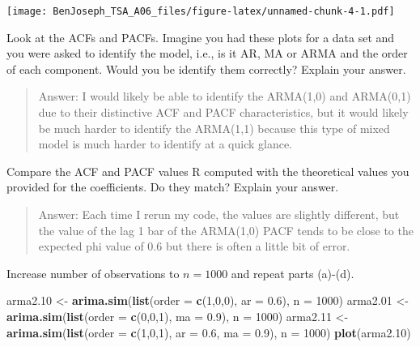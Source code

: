\documentclass[
]{article}
\newenvironment{Shaded}{\begin{snugshade}}{\end{snugshade}}
\newcommand{\DataTypeTok}[1]{\textcolor[rgb]{0.13,0.29,0.53}{#1}}
\newcommand{\DecValTok}[1]{\textcolor[rgb]{0.00,0.00,0.81}{#1}}
\newcommand{\FloatTok}[1]{\textcolor[rgb]{0.00,0.00,0.81}{#1}}
\newcommand{\KeywordTok}[1]{\textcolor[rgb]{0.13,0.29,0.53}{\textbf{#1}}}
\newcommand{\NormalTok}[1]{#1}
\newcommand{\StringTok}[1]{\textcolor[rgb]{0.31,0.60,0.02}{#1}}
\begin{document}
\texttt{[image: BenJoseph\_TSA\_A06\_files/figure-latex/unnamed-chunk-4-1.pdf]}

\item

Look at the ACFs and PACFs. Imagine you had these plots for a data set
and you were asked to identify the model, i.e., is it AR, MA or ARMA and
the order of each component. Would you be identify them correctly?
Explain your answer.

\begin{quote}
Answer: I would likely be able to identify the ARMA(1,0) and ARMA(0,1)
due to their distinctive ACF and PACF characteristics, but it would
likely be much harder to identify the ARMA(1,1) because this type of
mixed model is much harder to identify at a quick glance.
\end{quote}

\item

Compare the ACF and PACF values R computed with the theoretical values
you provided for the coefficients. Do they match? Explain your answer.

\begin{quote}
Answer: Each time I rerun my code, the values are slightly different,
but the value of the lag 1 bar of the ARMA(1,0) PACF tends to be close
to the expected phi value of 0.6 but there is often a little bit of
error.
\end{quote}

\item

Increase number of observations to \(n=1000\) and repeat parts (a)-(d).

\begin{Shaded}
\begin{Highlighting}[]
\NormalTok{arma2}\FloatTok{.10}\NormalTok{ <-}\StringTok{ }\KeywordTok{arima.sim}\NormalTok{(}\KeywordTok{list}\NormalTok{(}\DataTypeTok{order =} \KeywordTok{c}\NormalTok{(}\DecValTok{1}\NormalTok{,}\DecValTok{0}\NormalTok{,}\DecValTok{0}\NormalTok{), }\DataTypeTok{ar =} \FloatTok{0.6}\NormalTok{), }\DataTypeTok{n =} \DecValTok{1000}\NormalTok{)}
\NormalTok{arma2}\FloatTok{.01}\NormalTok{ <-}\StringTok{ }\KeywordTok{arima.sim}\NormalTok{(}\KeywordTok{list}\NormalTok{(}\DataTypeTok{order =} \KeywordTok{c}\NormalTok{(}\DecValTok{0}\NormalTok{,}\DecValTok{0}\NormalTok{,}\DecValTok{1}\NormalTok{), }\DataTypeTok{ma =} \FloatTok{0.9}\NormalTok{), }\DataTypeTok{n =} \DecValTok{1000}\NormalTok{)}
\NormalTok{arma2}\FloatTok{.11}\NormalTok{ <-}\StringTok{ }\KeywordTok{arima.sim}\NormalTok{(}\KeywordTok{list}\NormalTok{(}\DataTypeTok{order =} \KeywordTok{c}\NormalTok{(}\DecValTok{1}\NormalTok{,}\DecValTok{0}\NormalTok{,}\DecValTok{1}\NormalTok{), }\DataTypeTok{ar =} \FloatTok{0.6}\NormalTok{, }\DataTypeTok{ma =} \FloatTok{0.9}\NormalTok{), }\DataTypeTok{n =} \DecValTok{1000}\NormalTok{)}
\KeywordTok{plot}\NormalTok{(arma2}\FloatTok{.10}\NormalTok{)}
\end{Highlighting}
\end{Shaded}
\end{document}
